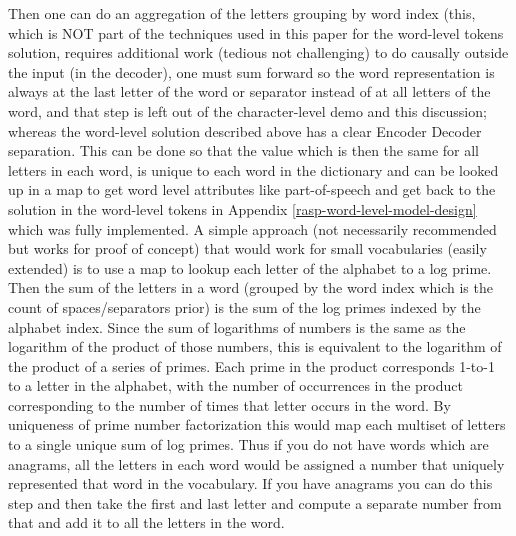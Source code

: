 \documentclass[11pt]{article}
\begin{document}
Then one can do an aggregation of the letters grouping by word index (this, which is NOT part of the techniques used in this paper for the word-level tokens solution, requires additional work (tedious not challenging) to do causally outside the input (in the decoder), one must sum forward so the word representation is always at the last letter of the word or separator instead of at all letters of the word, and that step is left out of the character-level demo and this discussion; whereas the word-level solution described above has a clear Encoder Decoder separation. This can be done so that the value which is then the same for all letters in each word, is unique to each word in the dictionary and can be looked up in a map to get word level attributes like part-of-speech and get back to the solution in the word-level tokens in Appendix \ref{rasp-word-level-model-design} which was fully implemented. A simple approach (not necessarily recommended but works for proof of concept) that would work for small vocabularies (easily extended) is to use a map to lookup each letter of the alphabet to a log prime. Then the sum of the letters in a word (grouped by the word index which is the count of spaces/separators prior) is the sum of the log primes indexed by the alphabet index. Since the sum of logarithms of numbers is the same as the logarithm of the product of those numbers, this is equivalent to the logarithm of the product of a series of primes. Each prime in the product corresponds 1-to-1 to a letter in the alphabet, with the number of occurrences in the product corresponding to the number of times that letter occurs in the word. By uniqueness of prime number factorization this would map each multiset of letters to a single unique sum of log primes. Thus if you do not have words which are anagrams, all the letters in each word would be assigned a number that uniquely represented that word in the vocabulary. If you have anagrams you can do this step and then take the first and last letter and compute a separate number from that and add it to all the letters in the word.
\end{document}

